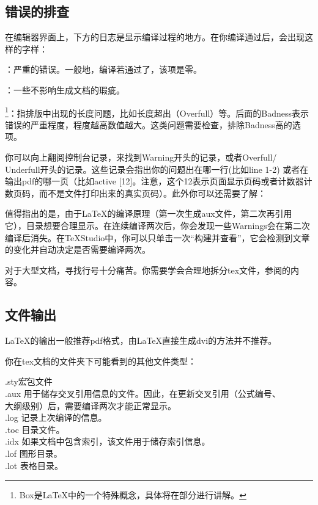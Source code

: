{\subsection{错误的排查}
\label{subsec:debug}
在编辑器界面上，下方的日志是显示编译过程的地方。在你编译通过后，会出现这样的字样：
\begin{feai}
	\item {}：严重的错误。一般地，编译若通过了，该项是零。
	\item {}：一些不影响生成文档的瑕疵。
	\item {\footnote{Box是\LaTeX{}中的一个特殊概念，具体将在\protect{}部分进行讲解。}}：指排版中出现的长度问题，比如长度超出（Overfull）等。后面的Badness表示错误的严重程度，程度越高数值越大。这类问题需要检查，排除Badness高的选项。
\end{feai}

你可以向上翻阅控制台记录，来找到Warning开头的记录，或者Overfull/ Underfull开头的记录。这些记录会指出你的问题出在哪一行(比如line 1-2) 或者在输出pdf的哪一页（比如active [12]。注意，这个12表示页面显示页码或者计数器计数页码，而不是文件打印出来的真实页码）。此外你可以还需要了解：
\begin{feai}
	\item 值得指出的是，由于\LaTeX{}的编译原理（第一次生成aux文件，第二次再引用它），目录想要合理显示。在连续编译两次后，你会发现一些Warnings会在第二次编译后消失。在\TeX Studio中，你可以只单击一次“构建并查看”，它会检测到文章的变化并自动决定是否需要编译两次。
	\item 对于大型文档，寻找行号十分痛苦。你需要学会合理地拆分tex文件，参阅的内容。
\end{feai}
\subsection{文件输出}
\LaTeX{}的输出一般推荐pdf格式，由\LaTeX 直接生成dvi的方法并不推荐。

你在tex文档的文件夹下可能看到的其他文件类型：
\begin{tabbing}
	.sty{\hspace{2em}}\=宏包文件\\
	.aux    \> 用于储存交叉引用信息的文件。因此，在更新交叉引用（公式编号、\\
	\> 大纲级别）后，需要编译两次才能正常显示。\\
	.log    \> 记录上次编译的信息。\\
	.toc    \> 目录文件。\\
	.idx    \> 如果文档中包含索引，该文件用于储存索引信息。\\
	.lof    \> 图形目录。\\
	.lot    \> 表格目录。
\end{tabbing}

}
